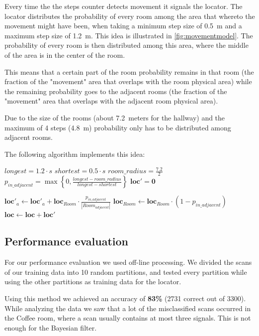 \documentclass[a4paper,10pt,twoside]{IEEEtran}
\begin{document}
Every time the the steps counter detects movement it signals the locator.
The locator distributes the probability of every room among the area that whereto the movement might have been, when taking a minimum step size of 0.5~m and a maximum step size of 1.2~m.
This idea is illustrated in \autoref{fig:movementmodel}.
The probability of every room is then distributed among this area, where the middle of the area is in the center of the room.

This means that a certain part of the room probability remains in that room (the fraction of the "movement"  area that overlaps with the room physical area) while the remaining probability goes to the adjacent rooms (the fraction of the "movement" area that overlaps with the adjacent room physical area).

Due to the size of the rooms (about 7.2~meters for the hallway) and the maximum of 4 steps (4.8~m) probability only has to be distributed among adjacent rooms.

The following algorithm implements this idea:
\begin{algorithmic}
	\State $longest = 1.2 \cdot s$
	\State $shortest = 0.5 \cdot s$
	\State $room\_radius = \frac{7.2}{2}$
	\State $p_{in\_adjacent} = \max\left\{0, \frac{longest - room\_radius}{longest-shortest}\right\}$
	\State $\mathbf{loc'} = \mathbf{0}$
		
			\State $\mathbf{loc'}_a \gets \mathbf{loc'}_{a} + \mathbf{loc}_{Room} \cdot \frac{p_{in\_adjacent}}{|Room_{adjacent}|} $
		\EndFor
		\State $\mathbf{loc}_{Room} \gets \mathbf{loc}_{Room} \cdot (1-p_{in\_adjacent})$
	\EndFor
	\State $\mathbf{loc} \gets \mathbf{loc} + \mathbf{loc'}$
\end{algorithmic}

\subsection{Performance evaluation}
\label{sec:loc-evaluation}

For our performance evaluation we used off-line processing. We divided the scans of our training data into 10 random partitions, and tested every partition while using the other partitions as training data for the locator.

Using this method we achieved an accuracy of \textbf{83\%} (2731 correct out of 3300).
While analyzing the data we saw that a lot of the misclassified scans occurred in the Coffee room,
where a scan usually contains at most three signals. This is not enough for the Bayesian filter.
\end{document}
